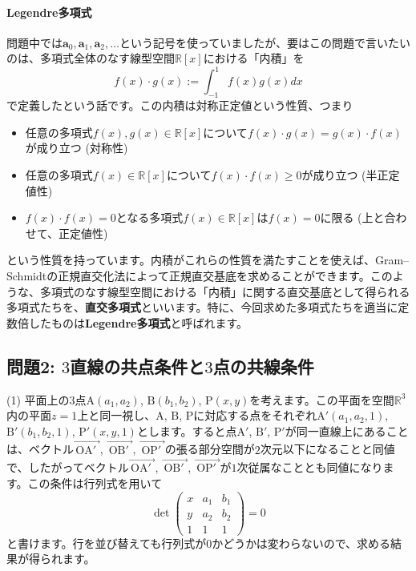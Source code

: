 \paragraph{Legendre多項式}

問題中では$\bm{a}_0, \bm{a}_1, \bm{a}_2, \ldots$という記号を使っていましたが、要はこの問題で言いたいのは、多項式全体のなす線型空間$\mathbb{R}[x]$における「内積」を
\[
f(x) \cdot g(x) := \int_{-1}^1 f(x)g(x) dx
\]
で定義したという話です。この内積は対称正定値という性質、つまり
\begin{itemize}
\item 任意の多項式$f(x), g(x) \in \mathbb{R}[x]$について$f(x) \cdot g(x) = g(x) \cdot f(x)$が成り立つ (対称性)
\item 任意の多項式$f(x) \in \mathbb{R}[x]$について$f(x) \cdot f(x) \geq 0$が成り立つ (半正定値性)
\item $f(x) \cdot f(x) = 0$となる多項式$f(x) \in \mathbb{R}[x]$は$f(x) = 0$に限る (上と合わせて、正定値性)
\end{itemize}
という性質を持っています。内積がこれらの性質を満たすことを使えば、Gram--Schmidtの正規直交化法によって正規直交基底を求めることができます。このような、多項式のなす線型空間における「内積」に関する直交基底として得られる多項式たちを、\textbf{直交多項式}といいます。特に、今回求めた多項式たちを適当に定数倍したものは\textbf{Legendre多項式}と呼ばれます。

\subsection{問題2: $3$直線の共点条件と$3$点の共線条件}

\noindent (1) 平面上の$3$点$\mathrm{A}(a_1, a_2)$, $\mathrm{B}(b_1, b_2)$, $\mathrm{P}(x, y)$を考えます。この平面を空間$\mathbb{R}^3$内の平面$z = 1$上と同一視し、$\mathrm{A}$, $\mathrm{B}$, $\mathrm{P}$に対応する点をそれぞれ$\mathrm{A}'(a_1, a_2, 1)$, $\mathrm{B}'(b_1, b_2, 1)$, $\mathrm{P}'(x, y, 1)$とします。すると点$\mathrm{A}'$, $\mathrm{B}'$, $\mathrm{P}'$が同一直線上にあることは、ベクトル$\overrightarrow{\,\mathrm{OA}'\,\,}$, $\overrightarrow{\,\mathrm{OB}'\,\,}$, $\overrightarrow{\,\mathrm{OP}'\,\,}$の張る部分空間が$2$次元以下になることと同値で、したがってベクトル$\overrightarrow{\,\mathrm{OA}'\,\,}$, $\overrightarrow{\,\mathrm{OB}'\,\,}$, $\overrightarrow{\,\mathrm{OP}'\,\,}$が$1$次従属なこととも同値になります。この条件は行列式を用いて
\[
\det
\begin{pmatrix}
x & a_1 & b_1 \\
y & a_2 & b_2 \\
1 & 1 & 1
\end{pmatrix}
= 0
\]
と書けます。行を並び替えても行列式が$0$かどうかは変わらないので、求める結果が得られます。

